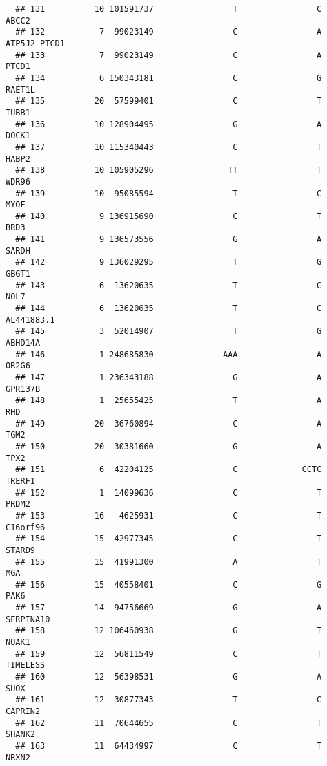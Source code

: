 \documentclass[12pt,twoside]{reedthesis}
\theoremstyle{definition}
\theoremstyle{definition}
\theoremstyle{remark}
\begin{document}
\begin{verbatim}
  ## 131          10 101591737                T                C          ABCC2
  ## 132           7  99023149                C                A   ATP5J2-PTCD1
  ## 133           7  99023149                C                A          PTCD1
  ## 134           6 150343181                C                G         RAET1L
  ## 135          20  57599401                C                T          TUBB1
  ## 136          10 128904495                G                A          DOCK1
  ## 137          10 115340443                C                T          HABP2
  ## 138          10 105905296               TT                T          WDR96
  ## 139          10  95085594                T                C           MYOF
  ## 140           9 136915690                C                T           BRD3
  ## 141           9 136573556                G                A          SARDH
  ## 142           9 136029295                T                G          GBGT1
  ## 143           6  13620635                T                C           NOL7
  ## 144           6  13620635                T                C     AL441883.1
  ## 145           3  52014907                T                G        ABHD14A
  ## 146           1 248685830              AAA                A          OR2G6
  ## 147           1 236343188                G                A        GPR137B
  ## 148           1  25655425                T                A            RHD
  ## 149          20  36760894                C                A           TGM2
  ## 150          20  30381660                G                A           TPX2
  ## 151           6  42204125                C             CCTC         TRERF1
  ## 152           1  14099636                C                T          PRDM2
  ## 153          16   4625931                C                T       C16orf96
  ## 154          15  42977345                C                T         STARD9
  ## 155          15  41991300                A                T            MGA
  ## 156          15  40558401                C                G           PAK6
  ## 157          14  94756669                G                A      SERPINA10
  ## 158          12 106460938                G                T          NUAK1
  ## 159          12  56811549                C                T       TIMELESS
  ## 160          12  56398531                G                A           SUOX
  ## 161          12  30877343                T                C        CAPRIN2
  ## 162          11  70644655                C                T         SHANK2
  ## 163          11  64434997                C                T          NRXN2

\end{verbatim}
\end{document}
